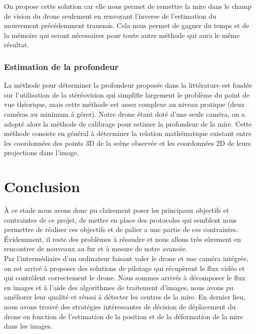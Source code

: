 \documentclass[12pt]{article}
\begin{document}
On propose cette solution car elle nous permet de remettre la mire dans le champ de vision du drone seulement en renvoyant l'inverse de l'estimation du mouvement précédemment transmis. Cela nous permet de gagner du temps et de la mémoire qui seront nécessaires pour toute autre méthode qui aura le même résultat. 

\subsubsection{Estimation de la profondeur}
La méthode pour déterminer la profondeur proposée dans la littérature est fondée sur l’utilisation de la stéréovision qui simplifie largement le problème du point de vue théorique, mais cette méthode est assez complexe au niveau pratique (deux caméras au minimum à gérer). Notre drone étant doté d'une seule caméra, on a adopté alors la méthode de calibrage \cite{Calibrage} pour estimer la profondeur de la mire. 
Cette méthode consiste en général à déterminer la relation mathématique existant entre les coordonnées des points 3D de la scène observée et les coordonnées 2D de leurs projections dans l'image.

\section{Conclusion}
À ce stade nous avons donc pu clairement poser les principaux objectifs et contraintes de ce projet, de mettre en place des protocoles qui semblent nous permettre de réaliser ces objectifs et de palier a une partie de ces contraintes. Évidemment, il reste des problèmes à résoudre et nous allons très sûrement en rencontrer de nouveaux au fur et à mesure de notre avancée.\\
Par l'intermédiaire d'un ordinateur faisant voler le drone et une caméra intégrée, on est arrivé à proposer des solutions de pilotage qui récupèrent le flux vidéo et qui contrôlent correctement le drone.
Nous sommes arrivés à décomposer le flux en images et à l'aide des algorithmes de traitement d'images, nous avons pu améliorer leur qualité et réussi à détecter les centres de la mire. En dernier lieu, nous avons trouvé des stratégies intéressantes de décision de déplacement du drone en fonction de l'estimation de la position et de la déformation de la mire dans les images.
\end{document}
